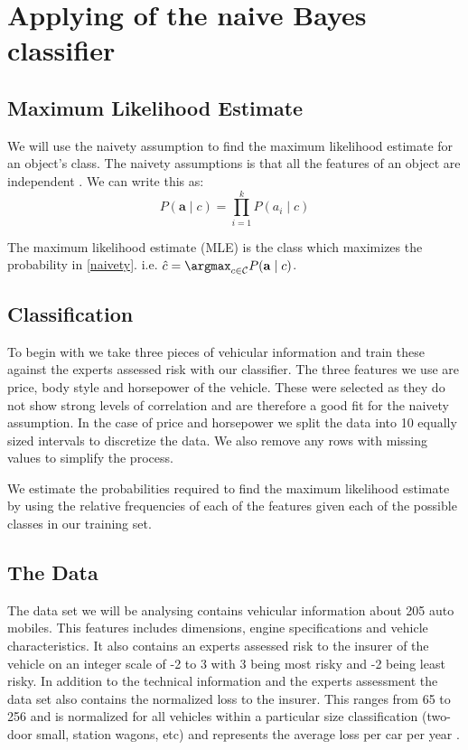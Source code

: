 \chapter{Applying of the naive Bayes classifier}

\section{Maximum Likelihood Estimate}
We will use the naivety assumption to find the maximum likelihood estimate for an object's class. The naivety assumptions is that all the features of an object are independent \cite{Zaffalon01}. We can write this as:
\begin{equation} \label{naivety}
	P(\mathbf{a} \mid c) = \prod_{i=1}^{k} P(a_i \mid c)
\end{equation}

The maximum likelihood estimate (MLE) is the class which maximizes the probability in \cref{naivety}. i.e. $\hat{c} = \argmax_{c \in \mathcal{C}} P(\mathbf{a} \mid c)$.

\section{Classification}
To begin with we take three pieces of vehicular information and train these against the experts assessed risk with our classifier. The three features we use are price, body style and horsepower of the vehicle. These were selected as they do not show strong levels of correlation and are therefore a good fit for the naivety assumption. In the case of price and horsepower we split the data into 10 equally sized intervals to discretize the data. We also remove any rows with missing values to simplify the process.

We estimate the probabilities required to find the maximum likelihood estimate by using the relative frequencies of each of the features given each of the possible classes in our training set.

\section{The Data}
The data set we will be analysing contains vehicular information about 205 auto mobiles. This features includes dimensions, engine specifications and vehicle characteristics. It also contains an experts assessed risk to the insurer of the vehicle on an integer scale of -2 to 3 with 3 being most risky and -2 being least risky. In addition to the technical information and the experts assessment the data set also contains the normalized loss to the insurer. This ranges from 65 to 256 and is normalized for all vehicles within a particular size classification (two-door small, station wagons, etc) and represents the average loss per car per year \cite{Automobile}.

